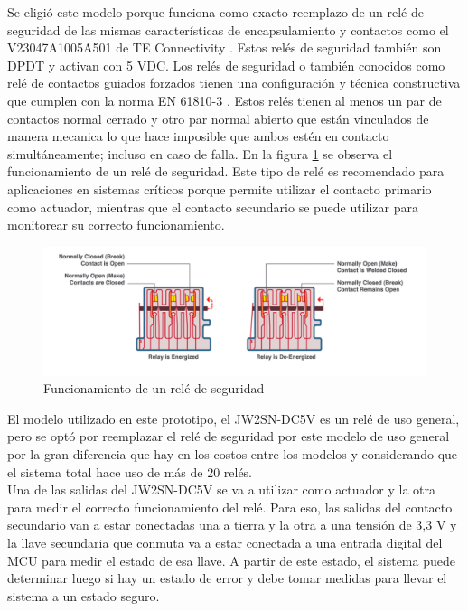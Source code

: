 Se eligió este modelo porque funciona como exacto reemplazo de un relé de seguridad de las mismas características de encapsulamiento y contactos como el V23047A1005A501 de TE Connectivity \cite{V23047A1005A501}. Estos relés de seguridad también son DPDT y activan con 5 VDC. Los relés de seguridad o también conocidos como relé de contactos guiados forzados tienen una configuración y técnica constructiva que cumplen con la norma EN 61810-3 \cite{norma_61810}. Estos relés tienen al menos un par de contactos normal cerrado y otro par normal abierto que están vinculados de manera mecanica lo que hace imposible que ambos estén en contacto simultáneamente; incluso en caso de falla. En la figura \ref{fig:rele_seguridad} se observa el funcionamiento de un relé de seguridad. Este tipo de relé es recomendado para aplicaciones en sistemas críticos porque permite utilizar el contacto primario como actuador, mientras que el contacto secundario se puede utilizar para monitorear su correcto funcionamiento. \\



\begin{figure}[H]
    \centering
    \includegraphics[width = \linewidth]{img/rele_seguridad.png}
    \caption{Funcionamiento de un relé de seguridad \cite{rele_img}}
    \label{fig:rele_seguridad}
\end{figure}


El modelo utilizado en este prototipo, el JW2SN-DC5V es un relé de uso general, pero se optó por reemplazar el relé de seguridad por este modelo de uso general por la gran diferencia que hay en los costos entre los modelos y considerando que el sistema total hace uso de más de 20 relés. \\

Una de las salidas del JW2SN-DC5V se va a utilizar como actuador y la otra para medir el correcto funcionamiento del relé. Para eso, las salidas del contacto secundario van a estar conectadas una a tierra y la otra a una tensión de 3,3 V y la llave secundaria que conmuta va a estar conectada a una entrada digital del MCU para medir el estado de esa llave. A partir de este estado, el sistema puede determinar luego si hay un estado de error y debe tomar medidas para llevar el sistema a un estado seguro. \\


